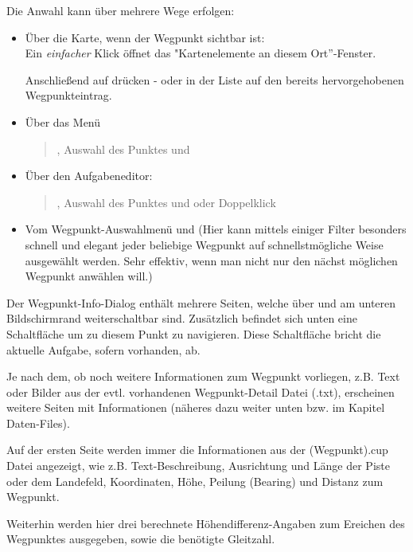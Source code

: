 Die Anwahl  kann über mehrere Wege erfolgen:
\begin{itemize}\itemsep=1em
\item
Über die Karte, wenn der Wegpunkt sichtbar ist: \\
Ein \textit{einfacher} Klick öffnet das "Kartenelemente an diesem Ort''-Fenster.

Anschließend auf  drücken - oder in der Liste auf den bereits hervorgehobenen Wegpunkteintrag.
%
%
\item
Über das Menü
\begin{quote}
\blink{}, Auswahl des Punktes und 
\end{quote}
%
%
\item Über den Aufgabeneditor: 
\begin{quote}
\blink{}\blink{}\blink{}, Auswahl des Punktes und  oder Doppelklick 
\end{quote}
%
%
\item%
Vom Wegpunkt-Auswahlmenü \blink{} und 
(Hier kann mittels einiger Filter besonders schnell und elegant jeder beliebige Wegpunkt auf schnellstmögliche Weise ausgewählt werden. Sehr effektiv, wenn man nicht nur den nächst möglichen Wegpunkt anwählen will.)
%
%
\end{itemize}

Der Wegpunkt-Info-Dialog enthält mehrere Seiten, welche über \button{$>$} und  \button{$<$} am unteren Bildschirmrand weiterschaltbar sind. Zusätzlich befindet sich unten eine Schaltfläche  um zu diesem Punkt zu navigieren. Diese Schaltfläche bricht die aktuelle Aufgabe, sofern vorhanden, ab.

Je nach dem, ob noch weitere Informationen zum Wegpunkt vorliegen, z.B. Text oder Bilder aus der evtl. vorhandenen Wegpunkt-Detail Datei (.txt), erscheinen weitere Seiten mit Informationen (näheres dazu weiter unten bzw. im Kapitel Daten-Files).

Auf der ersten Seite werden immer die Informationen aus der (Wegpunkt).cup Datei angezeigt, wie z.B. Text-Beschreibung, Ausrichtung und Länge der Piste oder dem Landefeld, Koordinaten, Höhe, Peilung (Bearing) und Distanz zum Wegpunkt.

Weiterhin werden hier drei berechnete Höhendifferenz-Angaben zum Ereichen des Wegpunktes ausgegeben, sowie die benötigte Gleitzahl.

